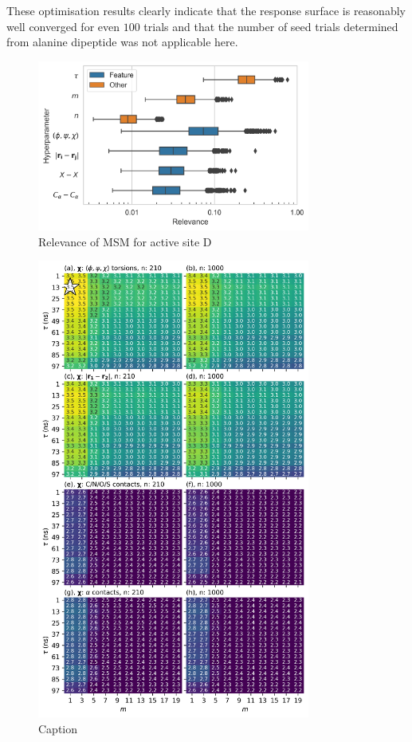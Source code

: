 These optimisation results clearly indicate that the response surface is reasonably well converged for even $100$ trials and that the number of seed trials determined from alanine dipeptide was not applicable here.  




\begin{figure}[!ht]
    \centering
    \caption{Relevance of MSM for active site D}
    \includegraphics[width=0.8\textwidth]{chapters/msm_optimization/figures/AADH_relevance_d.png}
    
    \label{fig:aadh_relevance}
\end{figure}

\begin{figure}[!ht]
    \centering
    \includegraphics[width=0.8\textwidth]{chapters/msm_optimization/figures/aadh_response_surface_d.png}
    \caption{Caption}
    \label{fig:aadh_rsm}
\end{figure}

